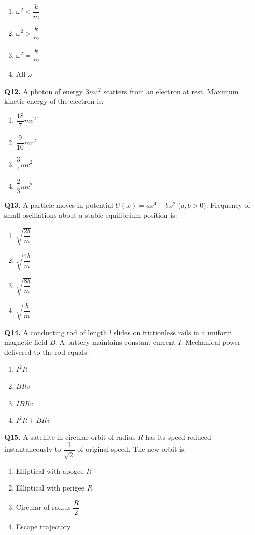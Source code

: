 \documentclass[12pt]{article}
\begin{document}
\begin{enumerate}[label=(\Alph*)]
\item $\omega^2 < \dfrac{k}{m}$
\item $\omega^2 > \dfrac{k}{m}$
\item $\omega^2 = \dfrac{k}{m}$
\item All $\omega$
\end{enumerate}

\textbf{Q12.}  
A photon of energy $3mc^2$ scatters from an electron at rest.  
Maximum kinetic energy of the electron is:

\begin{enumerate}[label=(\Alph*)]
\item $\dfrac{18}{7}mc^2$
\item $\dfrac{9}{10}mc^2$
\item $\dfrac{3}{4}mc^2$
\item $\dfrac{2}{3}mc^2$
\end{enumerate}

\textbf{Q13.}  
A particle moves in potential  
$U(x)=ax^4-bx^2$ ($a,b>0$).  
Frequency of small oscillations about a stable equilibrium position is:

\begin{enumerate}[label=(\Alph*)]
\item $\sqrt{\dfrac{2b}{m}}$
\item $\sqrt{\dfrac{4b}{m}}$
\item $\sqrt{\dfrac{8b}{m}}$
\item $\sqrt{\dfrac{b}{m}}$
\end{enumerate}

\textbf{Q14.}  
A conducting rod of length $l$ slides on frictionless rails in a uniform magnetic field $B$.  
A battery maintains constant current $I$.  
Mechanical power delivered to the rod equals:

\begin{enumerate}[label=(\Alph*)]
\item $I^2R$
\item $BIlv$
\item $I BIlv$
\item $I^2R + BIlv$
\end{enumerate}

\textbf{Q15.}  
A satellite in circular orbit of radius $R$ has its speed reduced instantaneously to  
$\dfrac{1}{\sqrt{2}}$ of original speed.  
The new orbit is:

\begin{enumerate}[label=(\Alph*)]
\item Elliptical with apogee $R$
\item Elliptical with perigee $R$
\item Circular of radius $\dfrac{R}{2}$
\item Escape trajectory
\end{enumerate}
\end{document}
